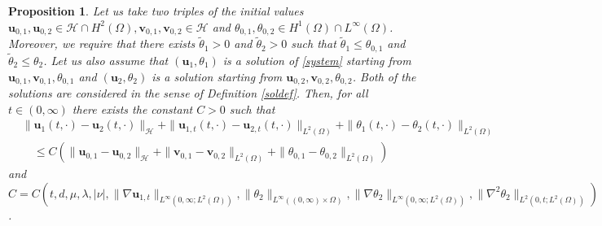 \documentclass[10pt,a4paper]{amsart}
\newtheorem{prop}{Proposition}
\renewcommand{\H}{\mathcal{H}}
\newcommand\bb[1]{\mathbf{#1}}
\newcommand{\bu}{\bb{u}}
\renewcommand{\hom}{H^1(\tn)}
\newcommand{\htwo}{H^2(\Omega)}
\newcommand{\ld}{L^2(\Omega)}
\newcommand{\tn}{\Omega}
\begin{document}
\begin{prop}\label{twcontdep}
Let us take two triples of the initial values $\bu_{0,1},\bu_{0,2}\in \H\cap\htwo, \bb v_{0,1},\bb v_{0,2}\in\H$ and $\theta_{0,1},\theta_{0,2}\in\hom\cap L^{\infty}(\tn)$. Moreover, we  require that there exists $\tilde\theta_1>0$ and $\tilde\theta_2>0$ such that $\tilde\theta_1\leq\theta_{0,1}$ and $\tilde\theta_2\leq\theta_2$.
Let us also assume that $(\bu_1,\theta_1)$ is a solution of \eqref{system} starting from $\bu_{0,1},\bb v_{0,1},\theta_{0,1}$ and $(\bu_2,\theta_2)$ is a
solution starting from $\bu_{0,2},\bb v_{0,2},\theta_{0,2}$. Both of the solutions are considered in the sense of Definition \ref{soldef}. Then, for all $t\in(0,\infty)$ there exists the constant $C>0$  such that
\begin{align*}
&\|\bu_1(t,\cdot)-\bu_2(t,\cdot)\|_{\H}+\|\bu_{1,t}(t,\cdot)-\bu_{2,t}(t,\cdot)\|_{\ld}+\|\theta_1(t,\cdot)-\theta_2(t,\cdot)\|_{\ld}\\
&\quad\leq C\left(\|\bu_{0,1}-\bu_{0,2}\|_{\H}+\|\bb v_{0,1}-\bb v_{0,2}\|_{\ld}+\|\theta_{0,1}-\theta_{0,2}\|_{\ld}\right)
\end{align*}
and $C=C(t,d,\mu,\lambda,|\nu|, \|\nabla \bu_{1,t}\|_{L^{\infty}(0,\infty;\ld)},\|\theta_2\|_{L^{\infty}((0,\infty)\times\tn)},\|\nabla \theta_2\|_{L^{\infty}(0,\infty;\ld)}, \|\nabla^2\theta_2\|_{L^2(0,t;\ld)})$.
\end{prop}
\end{document}

